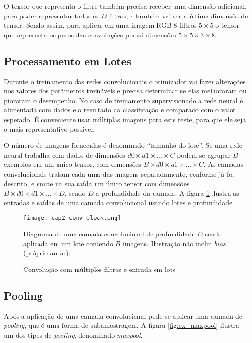 O tensor que representa o filtro também precisa receber uma dimensão adicional,
para poder representar todos os $D$ filtros, e também vai ser a última dimensão
do tensor. Sendo assim, para aplicar em uma imagem RGB 8 filtros $5 \times 5$ o
tensor que representa os pesos das convoluções possui dimensões $5 \times 5
\times 3 \times 8$.

\subsection{Processamento em Lotes}
Durante o treinamento das redes convolucionais o otimizador vai fazer
alterações nos valores dos parâmetros treináveis e precisa determinar se elas
melhoraram ou pioraram o desempenho. No caso de treinamento supervisionado
a rede neural é alimentada com dados e o resultado da classificação é comparado
com o valor esperado. É conveniente usar múltiplas imagens para este teste,
para que ele seja o mais representativo possível.

O número de imagens fornecidas é denominado ``tamanho do lote''. Se uma rede
neural trabalha com dados de dimensões $d0 \times d1 \times ... \times C$
podem-se agrupar $B$ exemplos em
um único tensor, com dimensões $B \times d0 \times d1 \times ... \times C$.
As camadas convolucionais tratam cada uma das imagens separadamente,
conforme já foi descrito, e emite na sua saída um
único tensor com dimensões $B \times d0 \times d1 \times ... \times D$, sendo
$D$ a profundidade da camada. A figura \ref{fig:cap2_conv_block} ilustra as
entradas e saídas de uma camada convolucional usando lotes e profundidade.

\begin{figure}[!htb]
	\centering
	\texttt{[image: cap2\_conv\_block.png]}
	\caption{Convolução com múltiplos filtros e entrada em lote}
	\label{fig:cap2_conv_block}
	Diagrama de uma camada convolucional de profundidade $D$ sendo aplicada em
	um lote contendo $B$ imagens. Ilustração não inclui \emph{bias}
	(próprio autor).
\end{figure}

\subsection{Pooling}
Após a aplicação de uma camada convolucional pode-se aplicar uma camada de
\emph{pooling}, que é uma forma de subamostragem. A figura
\ref{fig:ex_maxpool} ilustra um dos tipos de \emph{pooling}, denominado
\emph{maxpool}.

